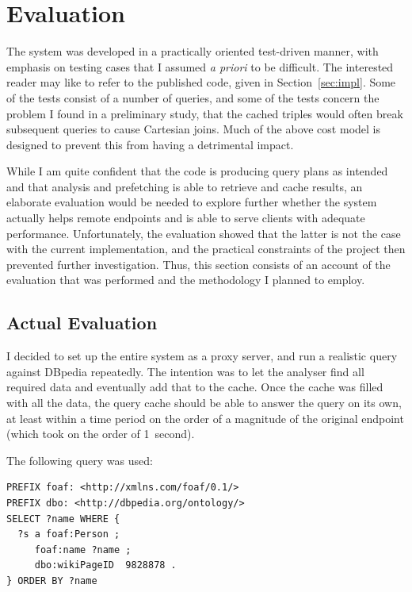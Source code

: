 \section{Evaluation}

The system was developed in a practically oriented test-driven manner,
with emphasis on testing cases that I assumed \textit{a priori} to be
difficult. The interested reader may like to refer to the published code,
given in Section~\ref{sec:impl}. Some of the tests consist of a number
of queries, and some of the tests concern the problem I found in a
preliminary study, that the cached triples would often break
subsequent queries to cause Cartesian joins. Much of the above cost
model is designed to prevent this from having a detrimental impact.

While I am quite confident that the code is producing query plans as
intended and that analysis and prefetching is able to retrieve and
cache results, an elaborate evaluation would be needed to explore
further whether the system actually helps remote endpoints and is able
to serve clients with adequate performance. Unfortunately, the
evaluation showed that the latter is not the case with the current
implementation, and the practical constraints of the project then
prevented further investigation. Thus, this section consists of an
account of the evaluation that was performed and the methodology I
planned to employ.

\subsection{Actual Evaluation}

I decided to set up the entire system as a proxy server, and run a
realistic query against DBpedia repeatedly. The intention was to let
the analyser find all required data and eventually add that to the
cache. Once the cache was filled with all the data, the query cache
should be able to answer the query on its own, at least within a time
period on the order of a magnitude of the original endpoint (which
took on the order of 1~second). 

The following query was used:

\begin{verbatim}
PREFIX foaf: <http://xmlns.com/foaf/0.1/>
PREFIX dbo: <http://dbpedia.org/ontology/>
SELECT ?name WHERE {
  ?s a foaf:Person ;
     foaf:name ?name ;
     dbo:wikiPageID  9828878 .
} ORDER BY ?name
\end{verbatim}

